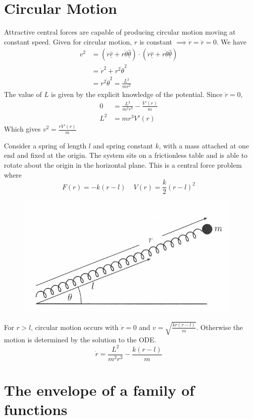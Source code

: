 \section{Circular Motion}
Attractive central forces are capable of producing circular motion moving at
constant speed. Given for circular motion, \( r \) is constant \( \implies
\dot{r} = \ddot{r} = 0 \). We have
\begin{align*}
  v^2 &= ( \dot{r} \underline{\hat{r}} + r \dot{\theta}
  \underline{\hat{\theta}})\cdot( \dot{r} \underline{\hat{r}} + r \dot{\theta}
  \underline{\hat{\theta}})\\
      &= \dot{r}^2 + r^2 \dot{\theta}^2\\
      &= r^2 \dot{\theta}^2 = \frac{L^2}{mr^2}
\end{align*}
The value of \( L \) is given by the explicit knowledge of the potential. Since
\( \ddot{r} = 0 \),
\begin{align*} 
  0 &= \frac{L^2}{m^2r^3} - \frac{V'(r)}{m}\\
  L^2 &= mr^3V'(r)  
\end{align*}
Which gives \( v^2 = \displaystyle \frac{rV'(r)}{m}\)
\begin{example}
Consider a spring of length \( l  \) and spring constant \( k \), with a mass
attached at one end and fixed at the origin. The system sits on a frictionless
table and is able to rotate about the origin in the horizontal plane. This is
a central force problem where
\[ 
  F(r) = -k(r-l) \;\;\;\; V(r) = \frac{k}{2}(r-l)^2
\]

\begin{figure}[h!]
  \centering
  \includegraphics[width=0.4\linewidth]{./lectures/fig.png}
\end{figure}
For \( r > l \), circular motion occurs with \( \dot{r} = 0 \) and \(
v = \displaystyle \sqrt{\frac{kr(r-l)}{m}} \). Otherwise the motion is
determined by the solution to the ODE.
\[ 
  \dot{r} = \frac{L^2}{m^2r^3} - \frac{k(r-l)}{m}
\]
\end{example}
\section{The envelope of a family of functions}

